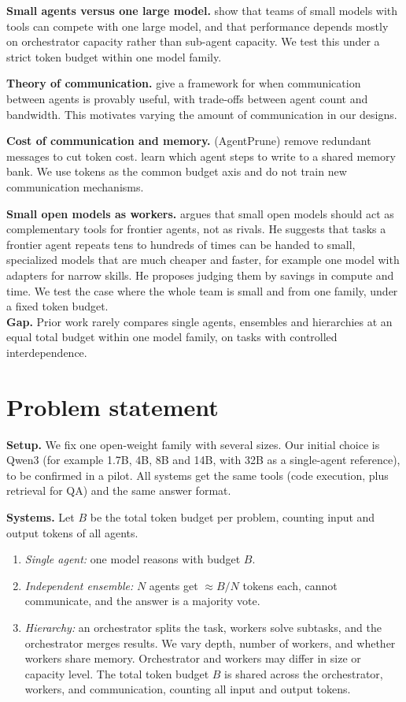\documentclass{article}
\begin{document}
\textbf{Small agents versus one large model.} \citet{zywot2026small} show that teams of small models with tools can compete with one large model, and that performance depends mostly on orchestrator capacity rather than sub-agent capacity. We test this under a strict token budget within one model family.

\textbf{Theory of communication.} \citet{rizvi2025benefits} give a framework for when communication between agents is provably useful, with trade-offs between agent count and bandwidth. This motivates varying the amount of communication in our designs.

\textbf{Cost of communication and memory.} \citet{zhang2025cut} (AgentPrune) remove redundant messages to cut token cost. \citet{fioresi2026learning} learn which agent steps to write to a shared memory bank. We use tokens as the common budget axis and do not train new communication mechanisms.

\textbf{Small open models as workers.} \citet{lambert2026next} argues that small open models should act as complementary tools for frontier agents, not as rivals. He suggests that tasks a frontier agent repeats tens to hundreds of times can be handed to small, specialized models that are much cheaper and faster, for example one model with adapters for narrow skills. He proposes judging them by savings in compute and time.  We test the case where the whole team is small and from one family, under a fixed token budget. \\

\textbf{Gap.} Prior work rarely compares single agents, ensembles and hierarchies at an equal total budget within one model family, on tasks with controlled interdependence.

\section{Problem statement}

\textbf{Setup.} We fix one open-weight family with several sizes. Our initial choice is Qwen3 (for example 1.7B, 4B, 8B and 14B, with 32B as a single-agent reference), to be confirmed in a pilot. All systems get the same tools (code execution, plus retrieval for QA) and the same answer format.

\textbf{Systems.} Let $B$ be the total token budget per problem, counting input and output tokens of all agents.
\begin{enumerate}
  \item \emph{Single agent:} one model reasons with budget $B$.
  \item \emph{Independent ensemble:} $N$ agents get $\approx B/N$ tokens each, cannot communicate, and the answer is a majority vote.
  \item \emph{Hierarchy:} an orchestrator splits the task, workers solve subtasks, and the orchestrator merges results. We vary depth, number of workers, and whether workers share memory. Orchestrator and workers may differ in size or capacity level. The total token budget $B$ is shared across the orchestrator, workers, and communication, counting all input and output tokens.
\end{enumerate}
\end{document}
